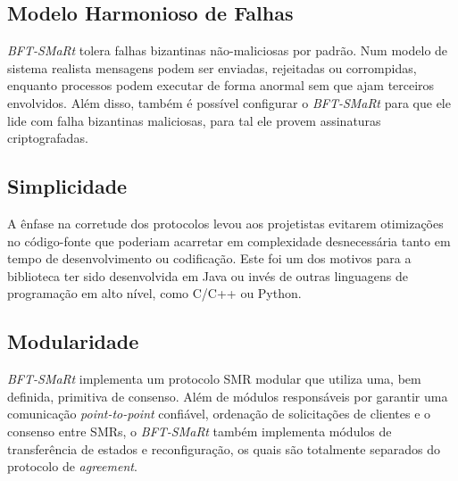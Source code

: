 		\subsection{Modelo Harmonioso de Falhas}
		\textit{BFT-SMaRt} tolera falhas bizantinas não-maliciosas por padrão. Num modelo de sistema realista mensagens podem ser enviadas, rejeitadas ou corrompidas, enquanto processos podem executar de forma anormal sem que ajam terceiros envolvidos. Além disso, também é possível configurar o \textit{BFT-SMaRt} para que ele lide com falha bizantinas maliciosas, para tal ele provem assinaturas criptografadas. \\
		
		\subsection{Simplicidade}
		A ênfase na corretude dos protocolos levou aos projetistas evitarem otimizações no código-fonte que poderiam acarretar em complexidade desnecessária tanto em tempo de desenvolvimento ou codificação. Este foi um dos motivos para a biblioteca ter sido desenvolvida em Java ou invés de outras linguagens de programação em alto nível, como C/C++ ou Python.\\
		
		\subsection{Modularidade}
		\textit{BFT-SMaRt} implementa um protocolo SMR modular que utiliza uma, bem definida, primitiva de consenso. Além de módulos responsáveis por garantir uma comunicação \textit{point-to-point} confiável, ordenação de solicitações de clientes e o consenso entre SMRs, o \textit{BFT-SMaRt} também implementa módulos de transferência de estados e reconfiguração, os quais são totalmente separados do protocolo de \textit{agreement}.\\
		
